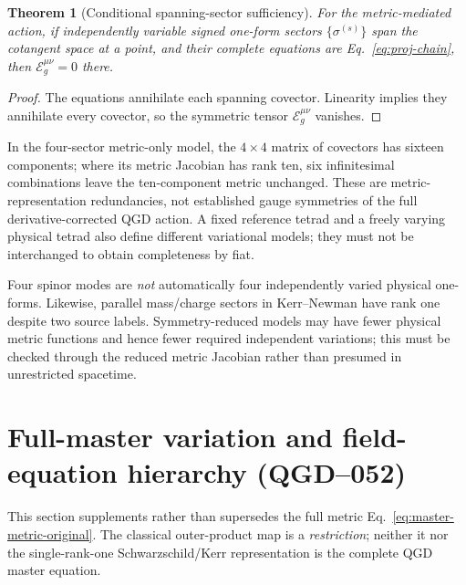 \documentclass[11pt,a4paper]{article}
\newtheorem{theorem}{Theorem}[section]
\begin{document}
\begin{theorem}[Conditional spanning-sector sufficiency]\label{thm:span}
For the metric-mediated action, if independently variable signed one-form sectors $\{\sigma^{(s)}\}$ span the cotangent space at a point, and their complete equations are Eq.~\eqref{eq:proj-chain}, then $\mathcal E_g^{\mu\nu}=0$ there.
\end{theorem}
\begin{proof}
The equations annihilate each spanning covector. Linearity implies they annihilate every covector, so the symmetric tensor $\mathcal E_g^{\mu\nu}$ vanishes.
\end{proof}
In the four-sector metric-only model, the $4\times4$ matrix of covectors has sixteen components; where its metric Jacobian has rank ten, six infinitesimal combinations leave the ten-component metric unchanged.  These are metric-representation redundancies, not established gauge symmetries of the full derivative-corrected QGD action.  A fixed reference tetrad and a freely varying physical tetrad also define different variational models; they must not be interchanged to obtain completeness by fiat.

Four spinor modes are \emph{not} automatically four independently varied physical one-forms. Likewise, parallel mass/charge sectors in Kerr--Newman have rank one despite two source labels. Symmetry-reduced models may have fewer physical metric functions and hence fewer required independent variations; this must be checked through the reduced metric Jacobian rather than presumed in unrestricted spacetime.

\section{Full-master variation and field-equation hierarchy (QGD--052)}\label{sec:qgd052-ch2}
This section supplements rather than supersedes the full metric
Eq.~\eqref{eq:master-metric-original}.  The classical outer-product map is a
\emph{restriction}; neither it nor the single-rank-one Schwarzschild/Kerr
representation is the complete QGD master equation.
\end{document}
